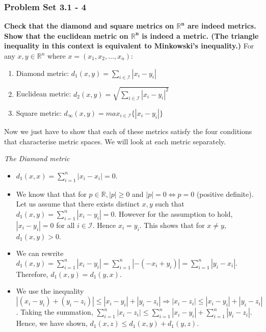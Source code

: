\begin{frame}{}
\frametitle{Problem Set 3.1 - 4}
\textbf{Check that the diamond and square metrics on $\bm{\mathbb{R}^n}$ are
indeed metrics. Show that the euclidean metric on $\bm{\mathbb{R}^n}$ is indeed
a metric. (The triangle inequality in this context is equivalent to Minkowski’s
inequality.)}\hfill\break
\hfill\break
For any ${x},{y} \in \mathbb{R}^n $ where $x = (x_1, x_2, \ldots,x_n)$: 
\begin{enumerate}
    \item Diamond metric: $d_1({x},{y}) = \sum_{i\in \mathcal{I}} |x_i - y_i| $
    \item Euclidean metric: $d_2({x},{y}) = \sqrt{\sum_{i\in \mathcal{I}} |x_i -
    y_i|^2} $
    \item Square metric: $d_{\infty}({x},{y}) = max_{i\in \mathcal{I}}\{|x_i -
    y_i|\}$
\end{enumerate}
\hfill\break
Now we just have to show that each of these metrics satisfy the four conditions
that characterise metric spaces. We will look at each metric separately.
\end{frame}

\begin{frame}{}
\textit{The Diamond metric}\hfill\break
\begin{itemize}
        \item $d_1(x,x) = \sum_{i=1}^{n} |x_i - x_i| = 0$.
        \hfill\break
    \pause
    \item  We know that that
    for $p \in \mathbb{R}, |p|\geq 0$ and $|p| = 0 \iff p = 0$ (positive
    definite). \hfill\break
    \hfill\break
    Let us assume that there exists distinct $x,y$ such that $d_1(x,y) = \sum_{i=1}^{n} |x_i - y_i| = 0$.\hfill\break
    \hfill\break
    However for the assumption to hold, $|x_i - y_i| = 0$ for all
    $i \in \mathcal{I}$. Hence $x_i = y_i$. This
    shows that for $x\neq y$, $d_1(x,y)>0$.
\end{itemize}
\end{frame}

\begin{frame}{}
\begin{itemize}
    \item We can rewrite $d_1(x,y) = \sum_{i=1}^{n} |x_i - y_i| = \sum_{i=1}^{n}
    |- (- x_i + y_i)| = \sum_{i=1}^{n} |y_i -
    x_i |.$ Therefore, $d_1(x,y) = d_1(y,x).$ \hfill\break
    \pause
    \item We use the inequality $|(x_i - y_i) + (y_i - z_i)| \leq |x_i -
    y_i| + |y_i - z_i| \Rightarrow |x_i - z_i| \leq |x_i - y_i| + |y_i - z_i|$.\hfill\break
    \hfill\break
    Taking the summation, $\sum_{i=1}^{n}|x_i - z_i| \leq \sum_{i=1}^{n}|x_i -
    y_i| + \sum_{i=1}^{n}|y_i - z_i|$. \\
    Hence, we have shown, $d_1(x,z) \leq
    d_1(x,y)+d_1(y,z).$
\end{itemize}
\end{frame}


